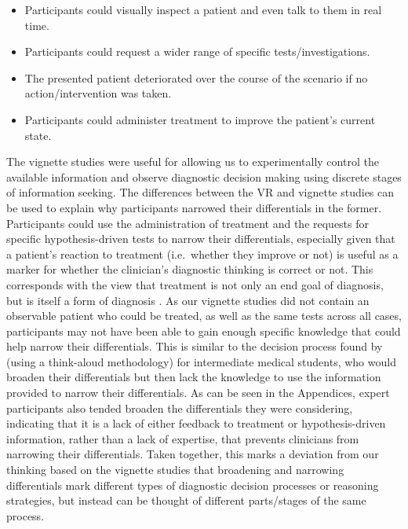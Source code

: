 \documentclass[a4paper, nobind]{templates/ociamthesis}
\providecommand{\tightlist}{%
  \setlength{\itemsep}{0pt}\setlength{\parskip}{0pt}}
\begin{document}
\begin{itemize}
\tightlist
\item
  Participants could visually inspect a patient and even talk to them in real time.
\item
  Participants could request a wider range of specific tests/investigations.
\item
  The presented patient deteriorated over the course of the scenario if no action/intervention was taken.
\item
  Participants could administer treatment to improve the patient's current state.
\end{itemize}

The vignette studies were useful for allowing us to experimentally control the available information and observe diagnostic decision making using discrete stages of information seeking. The differences between the VR and vignette studies can be used to explain why participants narrowed their differentials in the former. Participants could use the administration of treatment and the requests for specific hypothesis-driven tests to narrow their differentials, especially given that a patient's reaction to treatment (i.e.~whether they improve or not) is useful as a marker for whether the clinician's diagnostic thinking is correct or not. This corresponds with the view that treatment is not only an end goal of diagnosis, but is itself a form of diagnosis \autocite{brody_diagnosis_1980}. As our vignette studies did not contain an observable patient who could be treated, as well as the same tests across all cases, participants may not have been able to gain enough specific knowledge that could help narrow their differentials. This is similar to the decision process found by \textcite{arocha_novice_1995} (using a think-aloud methodology) for intermediate medical students, who would broaden their differentials but then lack the knowledge to use the information provided to narrow their differentials. As can be seen in the Appendices, expert participants also tended broaden the differentials they were considering, indicating that it is a lack of either feedback to treatment or hypothesis-driven information, rather than a lack of expertise, that prevents clinicians from narrowing their differentials. Taken together, this marks a deviation from our thinking based on the vignette studies that broadening and narrowing differentials mark different types of diagnostic decision processes or reasoning strategies, but instead can be thought of different parts/stages of the same process.
\end{document}
